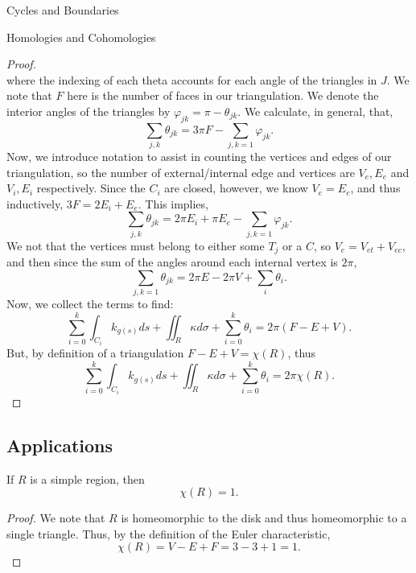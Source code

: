 \begin{subsubsection}{Cycles and Boundaries}
\begin{subsubsection}{Homologies and Cohomologies}
\begin{proof}
\begin{equation}
  \end{equation}
  where the indexing of each theta accounts for each angle of the triangles
  in $J$. We note that $F$ here is the number of faces in our triangulation.
  We denote the interior angles of the triangles by $\varphi_{jk}=\pi
  - \theta_{jk}$. We calculate, in general, that,
  \begin{equation}
    \sum_{j,k}\theta_{jk} = 3\pi F - \sum_{j,k=1}\varphi_{jk}.
  \end{equation}
  Now, we introduce notation to assist in counting the vertices and edges
  of our triangulation, so the number of external/internal edge and vertices
  are $V_e, E_e$ and $V_i, E_i$ respectively. Since the $C_i$ are closed,
  however, we know $V_e = E_e$, and thus inductively, $3F = 2E_i+E_e$. This
  implies,
  \begin{equation}
    \sum_{j,k}\theta_{jk} = 2\pi E_i+\pi E_e - \sum_{j,k=1}\varphi_{jk}.
  \end{equation}
  We not that the vertices must belong to either some $T_j$ or a $C$, so $V_e=
  V_{et}+V_{ec}$, and then since the sum of the angles around each internal 
  vertex is $2\pi$,
  \begin{equation}
  \sum_{j,k=1}\theta_{jk} = 2\pi E - 2\pi V + \sum_i\theta_i .
  \end{equation}
  Now, we collect the terms to find:
  \begin{equation}
    \sum_{i=0}^k\int_{C_i}k_{g(s)}ds +\iint_R\kappa d\sigma
    + \sum_{i=0}^k\theta_i = 2\pi(F-E+V).
  \end{equation}
  But, by definition of a triangulation $F-E+V = \chi(R)$, thus
  \begin{equation}
    \sum_{i=0}^k \int_{C_i} k_{g(s)} ds + \iint_R\kappa d\sigma
    + \sum_{i=0}^k\theta_i = 2\pi\chi(R).
  \end{equation}
\end{proof}
\subsection{Applications}
\begin{remark}
  If $R$ is a simple region, then 
  \begin{equation}
    \chi(R) = 1. \nonumber
  \end{equation}
\end{remark}
  \begin{proof}
    We note that $R$ is homeomorphic to the disk and thus homeomorphic to
    a single triangle. Thus, by the definition of the Euler characteristic,
    \begin{equation}
      \chi(R) = V-E+F = 3-3+1 =1.
    \end{equation}
  \end{proof}
  

\end{subsubsection}
\end{subsubsection}
